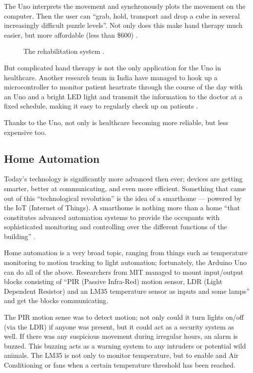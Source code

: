 \documentclass[11pt,letterpaper,twocolumn]{article}
\begin{document}
The Uno interprets the movement and synchronously plots the movement on the computer. Then the user can ``grab, hold, transport and drop a cube in several increasingly difficult puzzle levels''. Not only does this make hand therapy much easier, but more affordable (less than \$\num{600}) \cite{hand}.

\begin{figure}[!ht]
    \centering
    \caption{The rehabilitation system \cite{hand}.}
\end{figure}

But complicated hand therapy is not the only application for the Uno in healthcare. Another research team in India have managed to hook up a microcontroller to monitor patient heartrate through the course of the day with an Uno and a bright LED light and transmit the information to the doctor at a fixed schedule, making it easy to regularly check up on patients \cite{heartrate}.

Thanks to the Uno, not only is healthcare becoming more reliable, but less expensive too.

\subsection{Home Automation}
Today's technology is significantly more advanced then ever; devices are getting smarter, better at communicating, and even more efficient. Something that came out of this ``technological revolution'' is the idea of a smarthome --- powered by the IoT (Internet of Things). A smarthome is nothing more than a home ``that constitutes advanced automation systems to provide the occupants with sophisticated monitoring and controlling over the different functions of the building'' \cite{iot}.

Home automation is a very broad topic, ranging from things such as temperature monitoring to motion tracking to light automation; fortunately, the Arduino Uno can do all of the above. Researchers from MIT managed to mount input/output blocks consisting of ``PIR (Passive Infra-Red) motion sensor, LDR (Light Dependent Resistor) and an LM35 temperature sensor as inputs and some lamps'' and get the blocks communicating.

The PIR motion sense was to detect motion; not only could it turn lights on/off (via the LDR) if anyone was present, but it could act as a security system as well. If there was any suspicious movement during irregular hours, an alarm is buzzed. This buzzing acts as a warning system to any intruders or potential wild animals. The LM35 is not only to monitor temperature, but to enable and Air Conditioning or fans when a certain temperature threshold has been reached.
\end{document}
